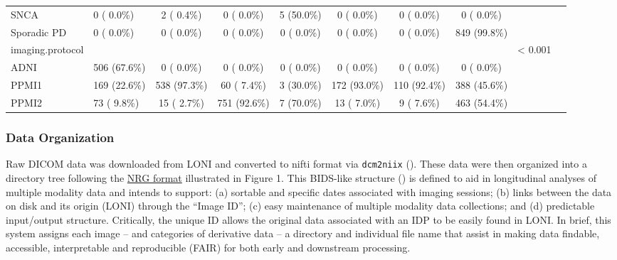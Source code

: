 \documentclass[
  table]{article}
\begin{document}
\begin{table}
\begin{center}
\begin{small}
\begin{tabular}{llccccccrr}
 \hspace{0.5cm} SNCA           & 0 ( 0.0\%)&2 ( 0.4\%)& 0 ( 0.0\%)&5 (50.0\%)& 0 ( 0.0\%)& 0 ( 0.0\%)& 0 ( 0.0\%)&\\ 
 \hspace{0.5cm} Sporadic PD    & 0 ( 0.0\%)& 0 ( 0.0\%)& 0 ( 0.0\%)& 0 ( 0.0\%)& 0 ( 0.0\%)& 0 ( 0.0\%)&849 (99.8\%)&\\ 
imaging.protocol   &&&&&&&&< 0.001\\ 
 \hspace{0.5cm} ADNI           &506 (67.6\%)& 0 ( 0.0\%)& 0 ( 0.0\%)& 0 ( 0.0\%)& 0 ( 0.0\%)& 0 ( 0.0\%)& 0 ( 0.0\%)&\\ 
 \hspace{0.5cm} PPMI1          &169 (22.6\%)&538 (97.3\%)&60 ( 7.4\%)&3 (30.0\%)&172 (93.0\%)&110 (92.4\%)&388 (45.6\%)&\\ 
 \hspace{0.5cm} PPMI2          &73 ( 9.8\%)&15 ( 2.7\%)&751 (92.6\%)&7 (70.0\%)&13 ( 7.0\%)&9 ( 7.6\%)&463 (54.4\%)&\\ 
\hline
\end{tabular}
\end{small}
\end{center}
\end{table}
\color{black}

\subsubsection{Data Organization}\label{data-organization}

Raw DICOM data was downloaded from LONI and converted to nifti format
via \texttt{dcm2niix} ().
These data were then organized into a directory tree following the
\href{https://github.com/stnava/biomedicalDataOrganization}{NRG format}
illustrated in Figure 1. This BIDS-like structure
() is
defined to aid in longitudinal analyses of multiple modality data and
intends to support: (a) sortable and specific dates associated with
imaging sessions; (b) links between the data on disk and its origin
(LONI) through the ``Image ID''; (c) easy maintenance of multiple
modality data collections; and (d) predictable input/output structure.
Critically, the unique ID allows the original data associated with an
IDP to be easily found in LONI. In brief, this system assigns each image
-- and categories of derivative data -- a directory and individual file
name that assist in making data findable, accessible, interpretable and
reproducible (FAIR) for both early and downstream processing.
\end{document}
